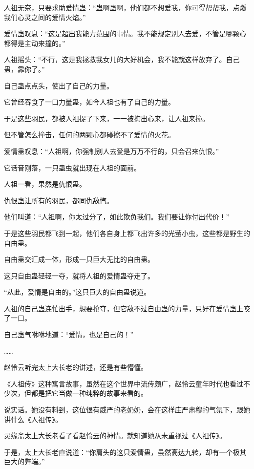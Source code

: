 
\begin{this_body}

人祖无奈，只要求助爱情蛊：“蛊啊蛊啊，他们都不想爱我，你可得帮帮我，点燃我们心灵之间的爱情火焰。”

爱情蛊叹息：“这是超出我能力范围的事情。我不能规定别人去爱，不管是哪颗心都得是主动来撞的。”

人祖摇头：“不行，这是我拯救我女儿的大好机会，我不能就这样放弃了。自己蛊，靠你了。”

自己蛊点点头，使出了自己的力量。

它曾经吞食了一口力量蛊，如今人祖也有了自己的力量。

于是这些羽民，都被人祖捉了下来，一一被掏出心来，让人祖来撞。

但不管怎么撞击，任何的两颗心都碰擦不了爱情的火花。

爱情蛊叹息：“人祖啊，你强制别人去爱是万万不行的，只会召来仇恨。”

它话音刚落，一只蛊虫就出现在人祖的面前。

人祖一看，果然是仇恨蛊。

仇恨蛊让所有的羽民，都同仇敌忾。

他们叫道：“人祖啊，你太过分了，如此欺负我们。我们要让你付出代价！”

于是这些羽民都飞到一起，他们各自身上都飞出许多的光萤小虫，这些都是野生的自由蛊。

自由蛊交汇成一体，形成一只巨大无比的自由蛊。

这只自由蛊轻轻一夺，就将人祖的爱情蛊夺走了。

“从此，爱情是自由的。”这只巨大的自由蛊说道。

人祖的自己蛊连忙出手，想要抢夺，但它敌不过自由蛊的力量，只好在爱情蛊上咬了一口。

自己蛊气咻咻地道：“爱情，也是自己的！”

……

赵怜云听完太上大长老的讲述，还是有些懵懂。

《人祖传》这种寓言故事，虽然在这个世界中流传颇广，赵怜云童年时代也看过不少次，但都是把它当做一种纯粹的故事来看的。

说实话。她没有料到，这位很有威严的老奶奶，会在这样庄严肃穆的气氛下，跟她讲什么《人祖传》。

灵缘斋太上大长老看了看赵怜云的神情。就知道她从未重视过《人祖传》。

于是，太上大长老直说道：“你肩头的这只爱情蛊，虽然高达九转，却有一个极其巨大的弊端。”


\end{this_body}
